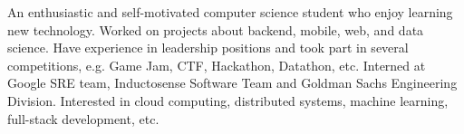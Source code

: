 

\begin{cvparagraph}

An enthusiastic and self-motivated computer science student who enjoy learning new technology. Worked on projects about backend, mobile, web, and data science. Have experience in leadership positions and took part in several competitions, e.g. Game Jam, CTF, Hackathon, Datathon, etc. Interned at Google SRE team, Inductosense Software Team and Goldman Sachs Engineering Division. Interested in cloud computing, distributed systems, machine learning, full-stack development, etc.
\end{cvparagraph}
